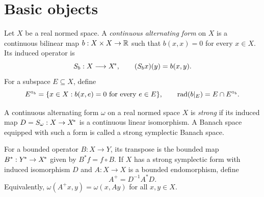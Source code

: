 \section{Basic objects}

\begin{definition}\label{def:weak-form}
Let $X$ be a real normed space. A \emph{continuous alternating form} on $X$ is a continuous
bilinear map $b:X\times X\to\mathbb R$ such that $b(x,x)=0$ for every $x\in X$. Its induced operator is
\[
  S_b:X\longrightarrow{X}^{\!*},
  \qquad (S_bx)(y)=b(x,y).
\]
For a subspace $E\subseteq X$, define
\[
  E^{\circ_b}=\{x\in X: b(x,e)=0\text{ for every }e\in E\},
  \qquad
  \operatorname{rad}(b|_E)=E\cap E^{\circ_b}.
\]
\leanok
\end{definition}

\begin{definition}\label{def:strong-form}
A continuous alternating form $\omega$ on a real normed space $X$ is \emph{strong} if its induced map
$D=S_\omega:X\to{X}^{\!*}$ is a continuous linear isomorphism. A Banach space equipped with
such a form is called a strong symplectic Banach space.
\leanok
\end{definition}

\begin{definition}\label{def:transpose-adjoint}
For a bounded operator $B:X\to Y$, its transpose is the bounded map
$B^*:{Y}^{\!*}\to{X}^{\!*}$ given by $B^*f=f\circ B$. If $X$ has a strong symplectic form with
induced isomorphism $D$ and $A:X\to X$ is a bounded endomorphism, define
\[
  A^+=D^{-1}A^*D.
\]
Equivalently, $\omega(A^+x,y)=\omega(x,Ay)$ for all $x,y\in X$.
\leanok
\end{definition}

